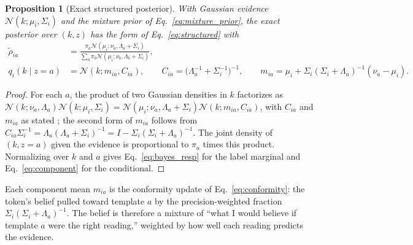 \documentclass[11pt]{article}
\newtheorem{proposition}{Proposition}
\theoremstyle{definition}
\theoremstyle{remark}
\newcommand{\N}{\mathcal{N}}
\begin{document}
\begin{proposition}[Exact structured posterior]
\label{prop:structured}
With Gaussian evidence $\N(k;\mu_i,\Sigma_i)$ and the mixture prior of Eq.~\eqref{eq:mixture_prior}, the exact posterior over $(k,z)$ has the form of Eq.~\eqref{eq:structured} with
\begin{align}
\tilde\rho_{ia}&=\frac{\pi_a\N(\mu_i;\nu_a,\Lambda_a+\Sigma_i)}{\sum_b\pi_b\N(\mu_i;\nu_b,\Lambda_b+\Sigma_i)},
\label{eq:bayes_resp}\\
q_i(k\mid z=a)&=\N(k;m_{ia},C_{ia}),\qquad
C_{ia}=\bigl(\Lambda_a^{-1}+\Sigma_i^{-1}\bigr)^{-1},\qquad
m_{ia}=\mu_i+\Sigma_i(\Sigma_i+\Lambda_a)^{-1}(\nu_a-\mu_i).
\label{eq:component}
\end{align}
\end{proposition}

\begin{proof}
For each $a$, the product of two Gaussian densities in $k$ factorizes as $\N(k;\nu_a,\Lambda_a)\N(k;\mu_i,\Sigma_i)=\N(\mu_i;\nu_a,\Lambda_a+\Sigma_i)\N(k;m_{ia},C_{ia})$, with $C_{ia}$ and $m_{ia}$ as stated \citep{bishop2006}; the second form of $m_{ia}$ follows from $C_{ia}\Sigma_i^{-1}=\Lambda_a(\Lambda_a+\Sigma_i)^{-1}=I-\Sigma_i(\Sigma_i+\Lambda_a)^{-1}$. The joint density of $(k,z=a)$ given the evidence is proportional to $\pi_a$ times this product. Normalizing over $k$ and $a$ gives Eq.~\eqref{eq:bayes_resp} for the label marginal and Eq.~\eqref{eq:component} for the conditional.
\end{proof}

Each component mean $m_{ia}$ is the conformity update of Eq.~\eqref{eq:conformity}: the token's belief pulled toward template $a$ by the precision-weighted fraction $\Sigma_i(\Sigma_i+\Lambda_a)^{-1}$. The belief is therefore a mixture of ``what I would believe if template $a$ were the right reading,'' weighted by how well each reading predicts the evidence.
\end{document}
